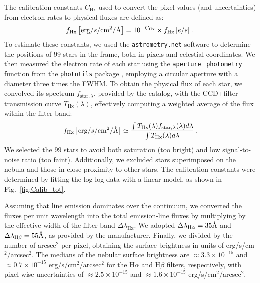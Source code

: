 \documentclass[fleqn,usenatbib]{mnras}
\begin{document}
The calibration constants $C_\text{Hx}$ used to convert the pixel values (and uncertainties) from electron rates to physical fluxes are defined as:
\begin{equation}
  f_\text{Hx}\left[\text{erg}/s/\text{cm}^2/\text{\r{A}}\right] = 10^{-C_\text{Hx}} \times f_\text{Hx}\left[e/s\right] \, .
  \label{eq:calibration}
\end{equation}
To estimate these constants, we used the \texttt{astrometry.net} software \citep{Astrometry_2010} to determine the positions of 99 stars in the frame, both in pixels and celestial coordinates.
We then measured the electron rate of each star using the \texttt{aperture}\_\texttt{photometry} function from the \texttt{photutils} package \citep{Bradley_2024}, employing a circular aperture with a diameter three times the FWHM.
To obtain the physical flux of each star, we convolved its spectrum $f_{\text{star}, \lambda}$, provided by the \cite{Gaia_2023} catalog, with the CCD+filter transmission curve $T_\text{Hx}(\lambda)$, effectively computing a weighted average of the flux within the filter band:
\begin{equation}
  f_\text{Hx}\left[\text{erg}/s/\text{cm}^2/\text{\r{A}}\right] \simeq 
  \frac{\int T_\text{Hx}(\lambda) f_{\text{star}, \lambda}(\lambda) d\lambda}{\int T_\text{Hx}(\lambda) d\lambda} \, .
  \label{eq:flux_convolution}
\end{equation}
We selected the 99 stars to avoid both saturation (too bright) and low signal-to-noise ratio (too faint). 
Additionally, we excluded stars superimposed on the nebula and those in close proximity to other stars.
The calibration constants were determined by fitting the log-log data with a linear model, as shown in Fig.~\ref{fig:Calib_tot}. 

Assuming that line emission dominates over the continuum, we converted the fluxes per unit wavelength into the total emission-line fluxes by multiplying by the effective width of the filter band $\Delta \lambda_\text{Hx}$.
We adopted $\Delta \lambda_{\text{H}\alpha} = 35 \text{\r{A}}$ and $\Delta \lambda_{\text{H}\beta} = 55 \text{\r{A}}$, as provided by the manufacturer. 
Finally, we divided by the number of arcsec$^2$ per pixel, obtaining the surface brightness in units of erg/s/cm$^2$/arcsec$^2$.
The medians of the nebular surface brightness are $\approx 3.3 \times 10^{-15}$ and $\approx 0.7 \times 10^{-15}$ erg/s/cm$^2$/arcsec$^2$ for the H$\alpha$ and H$\beta$ filters, respectively, with pixel-wise uncertainties of $\approx 2.5 \times 10^{-15}$ and $\approx 1.6 \times 10^{-15}$ erg/s/cm$^2$/arcsec$^2$.
\end{document}
